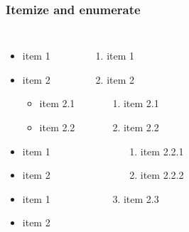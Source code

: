 \begin{frame}
	\frametitle{Itemize and enumerate}%
	\begin{columns}[t]
		\begin{itemize}
            \item item 1
            \item item 2
            \begin{itemize}
                \item item 2.1
                \item item 2.2
            \end{itemize}
            \item item 1
            \item item 2
            \item item 1
            \item item 2
        \end{itemize}
        \pause
        \begin{enumerate}
            \item item 1
            \item item 2
            \begin{enumerate}
                \item item 2.1
                \item item 2.2
                \begin{enumerate}
                    \item item 2.2.1
                    \item item 2.2.2
                \end{enumerate}
                \item item 2.3 
            \end{enumerate}
        \end{enumerate}
	\end{columns}
\end{frame}
